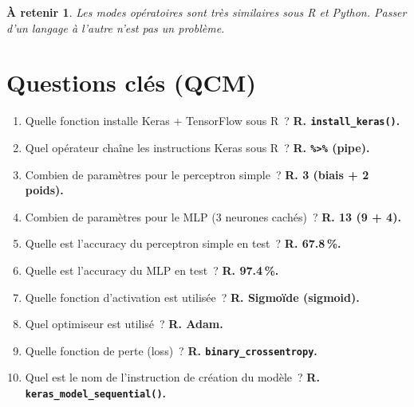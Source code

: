 \documentclass[a4paper,11pt]{article}
\newtheorem*{important}{\`A retenir}
\begin{document}
\begin{important}
  Les modes op\'eratoires sont tr\`es similaires sous R et Python.
  Passer d'un langage \`a l'autre n'est pas un probl\`eme.
\end{important}

\newpage
\section*{Questions cl\'es (QCM)}

\begin{enumerate}
  \item Quelle fonction installe Keras + TensorFlow sous R~?
    \textbf{R. \texttt{install\_keras()}.}
  \item Quel op\'erateur cha\^ine les instructions Keras sous R~?
    \textbf{R. \texttt{\%\textgreater{}\%} (pipe).}
  \item Combien de param\`etres pour le perceptron simple~?
    \textbf{R. 3 (biais + 2 poids).}
  \item Combien de param\`etres pour le MLP (3 neurones cach\'es)~?
    \textbf{R. 13 (9 + 4).}
  \item Quelle est l'accuracy du perceptron simple en test~?
    \textbf{R. 67.8\,\%.}
  \item Quelle est l'accuracy du MLP en test~?
    \textbf{R. 97.4\,\%.}
  \item Quelle fonction d'activation est utilis\'ee~?
    \textbf{R. Sigmo\"ide (sigmoid).}
  \item Quel optimiseur est utilis\'e~?
    \textbf{R. Adam.}
  \item Quelle fonction de perte (loss)~?
    \textbf{R. \texttt{binary\_crossentropy}.}
  \item Quel est le nom de l'instruction de cr\'eation du mod\`ele~?
    \textbf{R. \texttt{keras\_model\_sequential()}.}
\end{enumerate}

\vfill
\end{document}
